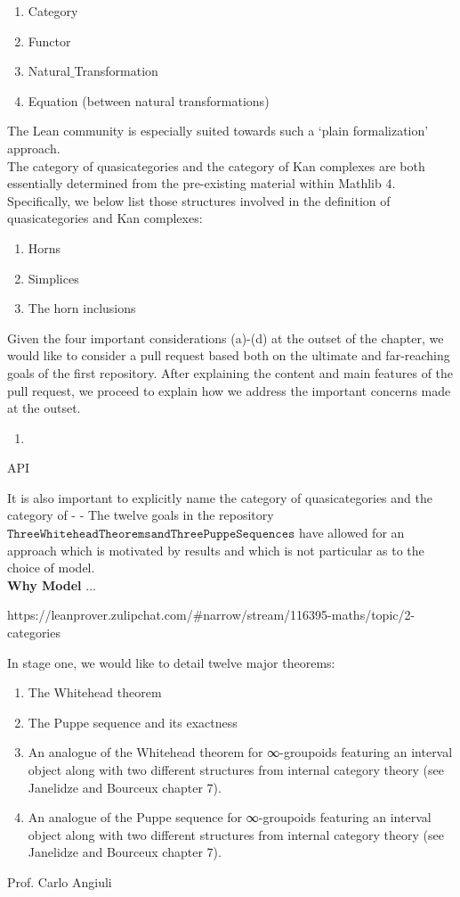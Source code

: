 \documentclass{book}
\begin{document}
\begin{enumerate}
\item Category
\item Functor 
\item Natural$\_$Transformation
\item Equation (between natural transformations)
\end{enumerate}

The Lean community is especially suited towards such a `plain formalization' approach. \\

The category of quasicategories and the category of Kan complexes are both essentially determined from the pre-existing material within Mathlib 4. Specifically, we below list those structures involved in the definition of quasicategories and Kan complexes:

\begin{enumerate}
\item Horns
\item Simplices
\item The horn inclusions
\end{enumerate}

Given the four important considerations (a)-(d) at the outset of the chapter, we would like to consider a pull request based both on the ultimate and far-reaching goals of the first repository. After explaining the content and main features of the pull request, we proceed to explain how we address the important concerns made at the outset.

\begin{enumerate}
\item 
\end{enumerate}

API 

It is also important to explicitly name the category of quasicategories and the category of 
-
-
The twelve goals in the repository $\texttt{ThreeWhiteheadTheoremsandThreePuppeSequences}$ have allowed for an approach which is motivated by results and which is not particular as to the choice of model. \\

{\bf Why Model} ...

https://leanprover.zulipchat.com/#narrow/stream/116395-maths/topic/2-categories

In stage one, we would like to detail twelve major theorems:

\begin{enumerate}
\item The Whitehead theorem
\item The Puppe sequence and its exactness
\item An analogue of the Whitehead theorem for ∞-groupoids featuring an interval object along with two different structures from internal category theory (see Janelidze and Bourceux chapter 7).
\item An analogue of the Puppe sequence for ∞-groupoids featuring an interval object along with two different structures from internal category theory (see Janelidze and Bourceux chapter 7).
\end{enumerate}


Prof. Carlo Angiuli
\fi
\end{document}

